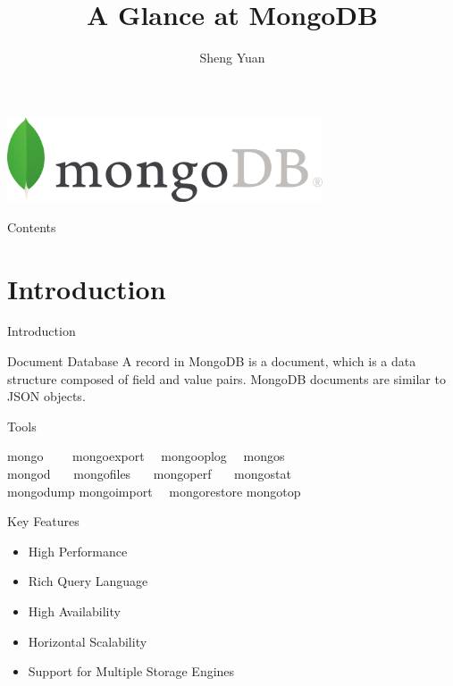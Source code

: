 \documentclass{beamer}
\title{A Glance at MongoDB}
\author{Sheng Yuan}
\begin{document}
    
\begin{frame}
	\centering\includegraphics[width=0.7\textwidth]{MongoDB-Logo.png}
    \titlepage
\end{frame}

\begin{frame}{Contents}
    \tableofcontents
\end{frame}

\section{Introduction}
\begin{frame}{Introduction}
	\begin{block}{Document Database}
		A record in MongoDB is a document, which is a data structure composed of field and value pairs. MongoDB documents are similar to JSON objects. 
	\end{block}

	\begin{block}{Tools}
		\begin{Alms*}
			mongo ~~~\    mongoexport ~\ mongooplog ~\ mongos \\
			mongod ~~\    mongofiles ~~\ mongoperf ~~\ mongostat \\
			mongodump     mongoimport ~\ mongorestore  mongotop
		\end{Alms*}
	\end{block}

	\begin{block}{Key Features}
		\begin{itemize}
			\item High Performance
			\item Rich Query Language
			\item High Availability
			\item Horizontal Scalability
			\item Support for Multiple Storage Engines
		\end{itemize}
	\end{block}
\end{frame}
\end{document}

